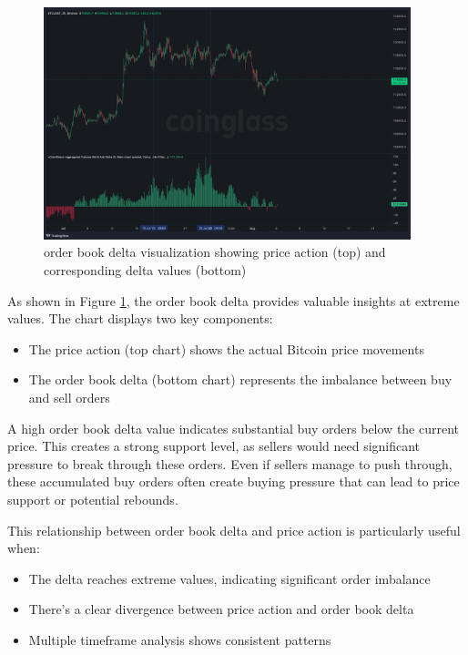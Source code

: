 \documentclass[12pt]{article}
\begin{document}
\begin{figure}[h]
    \centering
    \includegraphics[width=0.95\textwidth]{imgs/showcase_chart.png}
    \caption{order book delta visualization showing price action (top) and corresponding delta values (bottom)}
    \label{fig:order book_delta}
\end{figure}

As shown in Figure \ref{fig:order book_delta}, the order book delta provides valuable insights at extreme values. The chart displays two key components:
\begin{itemize}
    \item The price action (top chart) shows the actual Bitcoin price movements
    \item The order book delta (bottom chart) represents the imbalance between buy and sell orders
\end{itemize}

A high order book delta value indicates substantial buy orders below the current price. This creates a strong support level, as sellers would need significant pressure to break through these orders. Even if sellers manage to push through, these accumulated buy orders often create buying pressure that can lead to price support or potential rebounds.

This relationship between order book delta and price action is particularly useful when:
\begin{itemize}
    \item The delta reaches extreme values, indicating significant order imbalance
    \item There's a clear divergence between price action and order book delta
    \item Multiple timeframe analysis shows consistent patterns
\end{itemize}
\end{document}
